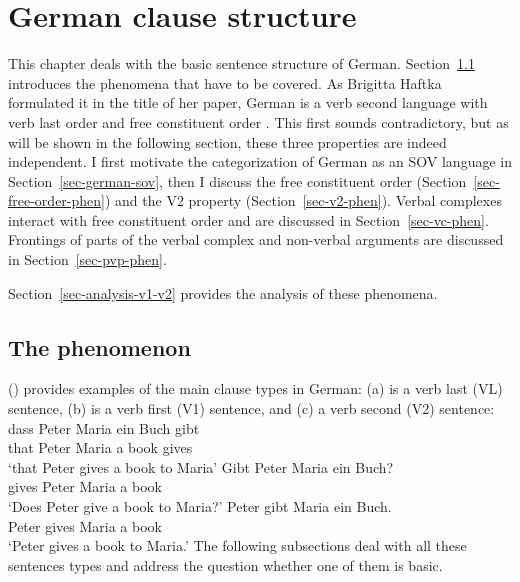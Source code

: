 

\chapter{German clause structure}
\label{chap-german-sentence-structure}

This chapter deals with the basic sentence structure of German. Section~\ref{sec-german-order}
introduces the phenomena that have to be covered. As Brigitta Haftka formulated it in the title of
her paper, German is a verb second language with verb last order and free constituent order
\citep{Haftka96a}. This first sounds contradictory, but as will be shown in the following section,
these three properties are indeed independent. I first motivate the categorization of German as
an SOV language in Section~\ref{sec-german-sov}, then I discuss the free constituent order (Section~\ref{sec-free-order-phen}) and the V2
property (Section~\ref{sec-v2-phen}). Verbal complexes interact with free constituent order and are discussed in
Section~\ref{sec-vc-phen}. Frontings of parts of the verbal complex and non-verbal arguments are discussed in
Section~\ref{sec-pvp-phen}.

Section~\ref{sec-analysis-v1-v2} provides the analysis of these phenomena.


\section{The phenomenon}
\label{sec-german-order}



() provides examples of the main clause types in German: (a) is a verb last (VL) sentence,
(b) is a verb first (V1) sentence, and (c) a verb second (V2) sentence:
\eal
\ex 
\gll dass Peter Maria ein Buch gibt\\
     that Peter Maria a book gives\\
\glt `that Peter gives a book to Maria'
\ex
\gll Gibt Peter Maria ein Buch?\\
     gives Peter Maria a book\\
\glt `Does Peter give a book to Maria?'
\ex
\gll Peter gibt Maria ein Buch.\\
     Peter gives Maria a book\\
\glt `Peter gives a book to Maria.'
\zl
The following subsections deal with all these sentences types and address the question whether one
of them is basic.


